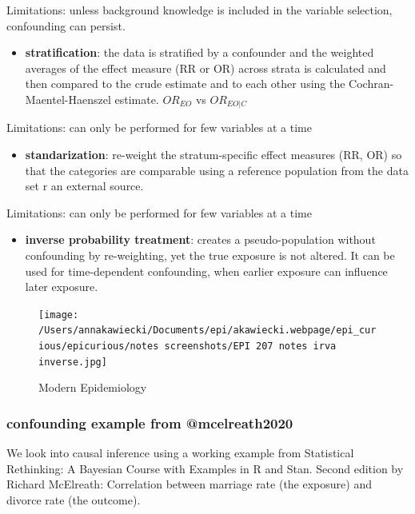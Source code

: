 \documentclass[
]{article}
\providecommand{\tightlist}{%
  \setlength{\itemsep}{0pt}\setlength{\parskip}{0pt}}
\begin{document}
Limitations: unless background knowledge is included in the variable
selection, confounding can persist.

\begin{itemize}
\tightlist
\item
  \textbf{stratification}: the data is stratified by a confounder and
  the weighted averages of the effect measure (RR or OR) across strata
  is calculated and then compared to the crude estimate and to each
  other using the Cochran-Maentel-Haenszel estimate. \(OR_{EO}\) vs
  \(OR_{EO|C}\)
\end{itemize}

Limitations: can only be performed for few variables at a time

\begin{itemize}
\tightlist
\item
  \textbf{standarization}: re-weight the stratum-specific effect
  measures (RR, OR) so that the categories are comparable using a
  reference population from the data set r an external source.
\end{itemize}

Limitations: can only be performed for few variables at a time

\begin{itemize}
\tightlist
\item
  \textbf{inverse probability treatment}: creates a pseudo-population
  without confounding by re-weighting, yet the true exposure is not
  altered. It can be used for time-dependent confounding, when earlier
  exposure can influence later exposure.
\end{itemize}

\begin{figure}
\centering
\texttt{[image: /Users/annakawiecki/Documents/epi/akawiecki.webpage/epi\_curious/epicurious/notes screenshots/EPI 207 notes irva inverse.jpg]}
\caption{Modern Epidemiology}
\end{figure}

\hypertarget{confounding-example-from-mcelreath2020}{%
\subsubsection{confounding example from
@mcelreath2020}\label{confounding-example-from-mcelreath2020}}

We look into causal inference using a working example from Statistical
Rethinking: A Bayesian Course with Examples in R and Stan. Second
edition by Richard McElreath: Correlation between marriage rate (the
exposure) and divorce rate (the outcome).
\end{document}
